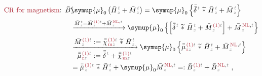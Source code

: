 \begin{subequations} \label{eq:cr}
\begin{align}
	\textcolor{Maroon}{\text{CR for magnetism}}\text{:}&\hspace{0.5em} \bar{B}^{\;\!\textcolor{gray}{t}}_{\;\!\textcolor{gray}{z}} \hspace{-1.5em} &&{\symup{\mu}}_0 \left( \bar{H}^{\;\!\textcolor{gray}{t}}_{\;\!\textcolor{gray}{z}} + \bar{M}^{\;\!\textcolor{gray}{t}}_{\;\!\textcolor{gray}{z}} \right) = {\symup{\mu}}_0 \left\{ \bar{\bar{\delta}}^{\;\!\textcolor{gray}{t}}~\widetilde *~\bar{H}^{\;\!\textcolor{gray}{t}}_{\;\!\textcolor{gray}{z}} + \bar{M}^{\;\!\textcolor{gray}{t}}_{\;\!\textcolor{gray}{z}} \right\} \\ & &&\xrightarrow[]{\bar{M}^{\;\!\textcolor{gray}{t}}_{\;\!\textcolor{gray}{z}} = \bar{M}^{\;\!\textcolor{Maroon}{\text{(1)}} \textcolor{gray}{t}}_{\;\!\textcolor{gray}{z}} + \bar{M}^{\;\!\textcolor{Maroon}{\text{NL}}, \textcolor{gray}{t}}_{\;\!\textcolor{gray}{z}}} {\symup{\mu}}_0 \left\{ \left[ \bar{\bar{\delta}}^{\;\!\textcolor{gray}{t}}~\widetilde *~\bar{H}^{\;\!\textcolor{gray}{t}}_{\;\!\textcolor{gray}{z}} + \bar{M}^{\;\!\textcolor{Maroon}{\text{(1)}} \textcolor{gray}{t}}_{\;\!\textcolor{gray}{z}} \right] + \bar{M}^{\;\!\textcolor{Maroon}{\text{NL}}, \textcolor{gray}{t}}_{\;\!\textcolor{gray}{z}} \right\} \\ & &&\xrightarrow[\displaystyle{ \bar{\bar{\mu}}^{\;\!\textcolor{Maroon}{\text{(1)}} \textcolor{gray}{t}}_{\;\!\textcolor{Maroon}{\text{r}}\textcolor{gray}{z}} := \bar{\bar{\delta}}^{\;\!\textcolor{gray}{t}} + \bar{\bar{\chi}}^{\;\!\textcolor{Maroon}{\text{(1)}}\textcolor{gray}{t}}_{\;\!\textcolor{Maroon}{\text{m}} \textcolor{gray}{z}}}]{\displaystyle{\bar{M}^{\;\!\textcolor{Maroon}{\text{(1)}} \textcolor{gray}{t}}_{\;\!\textcolor{gray}{z}} := \bar{\bar{\chi}}^{\;\!\textcolor{Maroon}{\text{(1)}}\textcolor{gray}{t}}_{\;\!\textcolor{Maroon}{\text{m}} \textcolor{gray}{z}} ~\widetilde *~\bar{H}^{\;\!\textcolor{gray}{t}}_{\;\!\textcolor{gray}{z}}}} {\symup{\mu}}_0 \left\{ \bar{\bar{\mu}}^{\;\!\textcolor{Maroon}{\text{(1)}} \textcolor{gray}{t}}_{\;\!\textcolor{Maroon}{\text{r}}\textcolor{gray}{z}}~\widetilde *~\bar{H}^{\;\!\textcolor{gray}{t}}_{\;\!\textcolor{gray}{z}} + \bar{M}^{\;\!\textcolor{Maroon}{\text{NL}}, \textcolor{gray}{t}}_{\;\!\textcolor{gray}{z}} \right\} \\ & &&= \bar{\bar{\mu}}^{\;\!\textcolor{Maroon}{\text{(1)}} \textcolor{gray}{t}}_{\;\!\textcolor{gray}{z}}~\widetilde *~\bar{H}^{\;\!\textcolor{gray}{t}}_{\;\!\textcolor{gray}{z}} + {\symup{\mu}}_0 \bar{M}^{\;\!\textcolor{Maroon}{\text{NL}}, \textcolor{gray}{t}}_{\;\!\textcolor{gray}{z}} =: \bar{B}^{\;\!\textcolor{Maroon}{\text{(1)}} \textcolor{gray}{t}}_{\;\!\textcolor{gray}{z}} + \bar{B}^{\;\!\textcolor{Maroon}{\text{NL}}, \textcolor{gray}{t}}_{\;\!\textcolor{gray}{z}}~, \label{cr-b} \\

\end{align}
\end{subequations}
